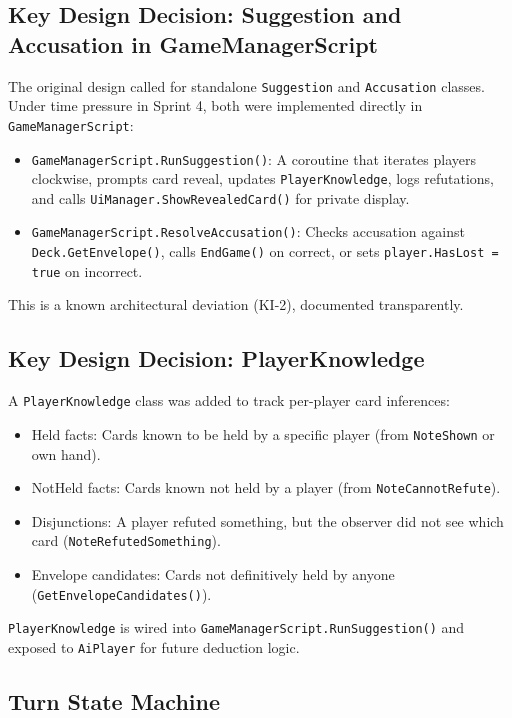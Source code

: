 \subsection*{Key Design Decision: Suggestion and Accusation in GameManagerScript}

The original design called for standalone \texttt{Suggestion} and \texttt{Accusation} classes. Under time pressure in Sprint 4, both were implemented directly in \texttt{GameManagerScript}:

\begin{itemize}
    \item \texttt{GameManagerScript.RunSuggestion()}: A coroutine that iterates players clockwise, prompts card reveal, updates \texttt{PlayerKnowledge}, logs refutations, and calls \texttt{UiManager.ShowRevealedCard()} for private display.
    \item \texttt{GameManagerScript.ResolveAccusation()}: Checks accusation against \texttt{Deck.GetEnvelope()}, calls \texttt{EndGame()} on correct, or sets \texttt{player.HasLost = true} on incorrect.
\end{itemize}

This is a known architectural deviation (KI-2), documented transparently.

\subsection*{Key Design Decision: PlayerKnowledge}

A \texttt{PlayerKnowledge} class was added to track per-player card inferences:
\begin{itemize}
    \item Held facts: Cards known to be held by a specific player (from \texttt{NoteShown} or own hand).
    \item NotHeld facts: Cards known not held by a player (from \texttt{NoteCannotRefute}).
    \item Disjunctions: A player refuted something, but the observer did not see which card (\texttt{NoteRefutedSomething}).
    \item Envelope candidates: Cards not definitively held by anyone (\texttt{GetEnvelopeCandidates()}).
\end{itemize}

\texttt{PlayerKnowledge} is wired into \texttt{GameManagerScript.RunSuggestion()} and exposed to \texttt{AiPlayer} for future deduction logic.

\subsection*{Turn State Machine}

